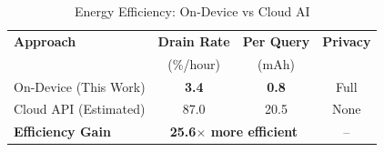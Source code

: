 \begin{table}[htbp]
\centering
\caption{Energy Efficiency: On-Device vs Cloud AI}
\label{tab:energy}
\begin{tabular}{lccc}
\toprule
\textbf{Approach} & \textbf{Drain Rate} & \textbf{Per Query} & \textbf{Privacy} \\
 & (\%/hour) & (mAh) & \\
\midrule
On-Device (This Work) & \textbf{3.4} & \textbf{0.8} & Full \\
Cloud API (Estimated) & 87.0 & 20.5 & None \\
\midrule
\textbf{Efficiency Gain} & \multicolumn{2}{c}{\textbf{25.6$\times$ more efficient}} & -- \\
\bottomrule
\end{tabular}
\end{table}